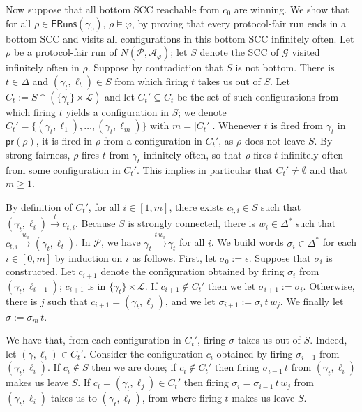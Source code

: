 \documentclass[10pt,a4paper]{article}
\renewcommand{\geq}{\geqslant}
\newcommand{\set}[1]{\{#1\}}
\newcommand{\nset}[2]{[#1,#2]}
\newcommand{\deff}{:=}
\newcommand{\concat}{\,}
\newcommand{\size}[1]{|#1|}
\newcommand{\prot}{\mathcal{P}}
\newcommand{\fairrunsfrom}[1]{\mathsf{FRuns}(#1)}
\newcommand{\config}{\gamma}
\newcommand{\step}[1]{\xrightarrow{#1}}
\newcommand{\run}{\rho}
\newcommand{\transitions}{\Delta}
\newcommand*{\atrans}{t}
\newcommand*{\buchiaut}{\mathcal{A}}
\newcommand*{\ltlaut}[1]{\buchiaut_{#1}}
\newcommand{\bstates}{\mathcal{L}}
\newcommand*{\abuchistate}{\ell}
\newcommand*{\bstate}{\abuchistate}
\newcommand{\prodnet}[2]{N(#1, \ltlaut{#2})}
\newcommand{\protproj}[1]{\mathsf{pr}(#1)}
\newcommand{\configout}{\config_t}
\newcommand{\bstateout}{\bstate_t}
\newcommand{\Cout}{C_t}
\begin{document}
\begin{appendixproof}
	Now suppose that all bottom SCC reachable from \(c_0\) are winning.
	We show that for all \(\run \in \fairrunsfrom{\config_0}\), \(\run \models \varphi\), by proving that every protocol-fair run ends in a bottom SCC and visits all configurations in this bottom SCC infinitely often.
	Let \(\run\) be a protocol-fair run of \(\prodnet{\prot}{\varphi}\); let \(S\) denote the SCC of \(\mathcal{G}\) visited infinitely often in \(\run\).
	Suppose by contradiction that \(S\) is not bottom.
	There is \(\atrans \in \transitions\) and \((\configout,\bstateout) \in S\) from which firing \(\atrans\) takes us out of \(S\).
	Let \(\Cout \deff S \cap (\set{\configout} \times \bstates)\) and let \(\Cout' \subseteq \Cout\) be the set of such configurations from which firing \(\atrans\) yields a configuration in \(S\); we denote \(\Cout' = \set{(\configout, \bstate_1),\dots, (\configout,\bstate_m)}\) with \(m = \size{\Cout'}\).
	Whenever \(\atrans\) is fired from \(\configout\) in \(\protproj{\run}\), it is fired in \(\run\) from a configuration in \(\Cout'\), as \(\run\) does not leave \(S\).
	By strong fairness, \(\run\) fires \(\atrans\) from \(\configout\) infinitely often, so that \(\run\) fires \(\atrans\) infinitely often from some configuration in \(\Cout'\).
	This implies in particular that \(\Cout' \ne \emptyset\) and that \(m \geq 1\).

	By definition of \(\Cout'\), for all \(i \in \nset{1}{m}\), there exists \(c_{t,i} \in S\) such that \((\configout, \bstate_i) \step{t} c_{t,i}\).
	Because \(S\) is strongly connected, there is \(w_i \in \transitions^*\) such that \(c_{t,i} \step{w_i} (\configout, \bstateout)\).
	In \(\prot\), we have \(\configout \step{t \concat w_i} \configout\) for all \(i\).
	We build words \(\sigma_i \in \transitions^*\) for each \(i \in \nset{0}{m}\) by induction on \(i\) as follows.
	First, let \(\sigma_0 \deff \epsilon\).
	Suppose that \(\sigma_i\) is constructed.
	Let \(c_{i+1}\) denote the configuration obtained by firing \(\sigma_i\) from \((\configout, \bstate_{i+1})\); \(c_{i+1}\) is in \(\set{\configout} \times \bstates\).
	If \(c_{i+1} \notin \Cout'\) then we let \(\sigma_{i+1} \deff \sigma_i\).
	Otherwise, there is \(j\) such that \(c_{i+1} = (\configout, \bstate_j)\), and we let \(\sigma_{i+1} \deff \sigma_i \concat t \concat w_j\).
	We finally let \(\sigma \deff \sigma_m \concat t\).

	We have that, from each configuration in \(\Cout'\), firing \(\sigma\) takes us out of \(S\).
	Indeed, let \((\config, \bstate_i) \in \Cout'\).
	Consider the configuration \(c_{i}\) obtained by firing \(\sigma_{i-1}\) from \((\configout, \bstate_i)\).
	If \(c_{i} \notin S\) then we are done; if \(c_{i} \notin \Cout'\) then firing \(\sigma_{i-1} \concat t\) from \((\configout, \bstate_i)\) makes us leave \(S\).
	If \(c_{i} = (\configout, \bstate_j) \in \Cout'\) then firing \(\sigma_i = \sigma_{i-1} \concat t \concat w_j\) from \((\configout, \bstate_i)\) takes us to \((\configout,\bstateout)\), from where firing \(t\) makes us leave \(S\).


\end{appendixproof}
\end{document}
